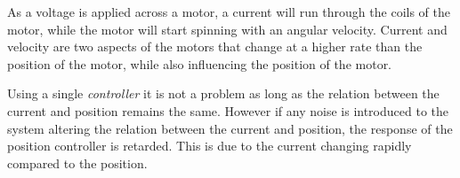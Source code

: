 \documentclass[../../main.tex]{subfiles}
\begin{document}



As a voltage is applied across a motor, a current will run through the coils of the motor, while the motor will start spinning with an angular velocity. Current and velocity are two aspects of the motors that change at a higher rate than the position of the motor, while also influencing the position of the motor. 

Using a single \textit{controller} it is not a problem as long as the relation between the current and position remains the same. 
However if any noise is introduced to the system altering the relation between the current and position, the response of the position controller is retarded. This is due to the current changing rapidly compared to the position. 
\end{document}

